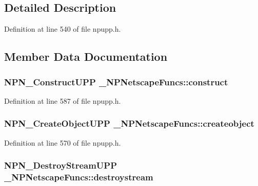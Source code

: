 \subsection{Detailed Description}


Definition at line 540 of file npupp.h.



\subsection{Member Data Documentation}
\hypertarget{struct___n_p_netscape_funcs_a30e9cb377bb00c30c605e5abfddf71f9}{
\subsubsection[{construct}]{\setlength{\rightskip}{0pt plus 5cm}NPN\_\-ConstructUPP {\bf \_\-NPNetscapeFuncs::construct}}}
\label{struct___n_p_netscape_funcs_a30e9cb377bb00c30c605e5abfddf71f9}


Definition at line 587 of file npupp.h.

\hypertarget{struct___n_p_netscape_funcs_a92e8a72c044a7118346d278c74c5d5f7}{
\subsubsection[{createobject}]{\setlength{\rightskip}{0pt plus 5cm}NPN\_\-CreateObjectUPP {\bf \_\-NPNetscapeFuncs::createobject}}}
\label{struct___n_p_netscape_funcs_a92e8a72c044a7118346d278c74c5d5f7}


Definition at line 570 of file npupp.h.

\hypertarget{struct___n_p_netscape_funcs_a2cf0d236a9bde9312b5241e282419403}{
\subsubsection[{destroystream}]{\setlength{\rightskip}{0pt plus 5cm}NPN\_\-DestroyStreamUPP {\bf \_\-NPNetscapeFuncs::destroystream}}}
\label{struct___n_p_netscape_funcs_a2cf0d236a9bde9312b5241e282419403}


